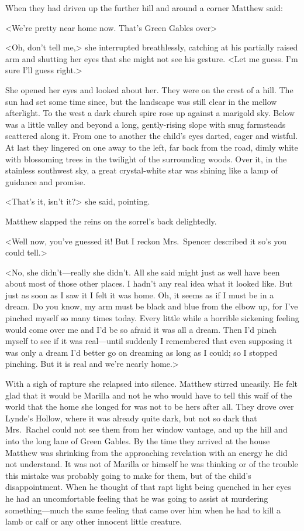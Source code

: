 When they had driven up the further hill and around a corner Matthew said:

<We're pretty near home now. That's Green Gables over\longdash>

<Oh, don't tell me,> she interrupted breathlessly, catching at his partially raised arm and shutting her eyes that she might not see his gesture. <Let me guess. I'm sure I'll guess right.>

She opened her eyes and looked about her. They were on the crest of a hill. The sun had set some time since, but the landscape was still clear in the mellow afterlight. To the west a dark church spire rose up against a marigold sky. Below was a little valley and beyond a long, gently-rising slope with snug farmsteads scattered along it. From one to another the child's eyes darted, eager and wistful. At last they lingered on one away to the left, far back from the road, dimly white with blossoming trees in the twilight of the surrounding woods. Over it, in the stainless southwest sky, a great crystal-white star was shining like a lamp of guidance and promise.

<That's it, isn't it?> she said, pointing.

Matthew slapped the reins on the sorrel's back delightedly.

<Well now, you've guessed it! But I reckon Mrs.~Spencer described it so's you could tell.>

<No, she didn't—really she didn't. All she said might just as well have been about most of those other places. I hadn't any real idea what it looked like. But just as soon as I saw it I felt it was home. Oh, it seems as if I must be in a dream. Do you know, my arm must be black and blue from the elbow up, for I've pinched myself so many times today. Every little while a horrible sickening feeling would come over me and I'd be so afraid it was all a dream. Then I'd pinch myself to see if it was real—until suddenly I remembered that even supposing it was only a dream I'd better go on dreaming as long as I could; so I stopped pinching. But it is real and we're nearly home.>

With a sigh of rapture she relapsed into silence. Matthew stirred uneasily. He felt glad that it would be Marilla and not he who would have to tell this waif of the world that the home she longed for was not to be hers after all. They drove over Lynde's Hollow, where it was already quite dark, but not so dark that Mrs.~Rachel could not see them from her window vantage, and up the hill and into the long lane of Green Gables. By the time they arrived at the house Matthew was shrinking from the approaching revelation with an energy he did not understand. It was not of Marilla or himself he was thinking or of the trouble this mistake was probably going to make for them, but of the child's disappointment. When he thought of that rapt light being quenched in her eyes he had an uncomfortable feeling that he was going to assist at murdering something—much the same feeling that came over him when he had to kill a lamb or calf or any other innocent little creature.

